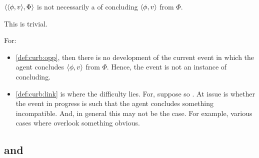 \begin{note}
  \begin{proposition}
    \(\langle \langle \phi, v \rangle, \Phi \rangle\) is not necessarily a  of concluding \(\langle \phi, v \rangle\) from \(\Phi\).
    \begin{argument}
      This is trivial.

      For:

      \begin{itemize}
      \item
        \ref{def:curb:opp}, then there is no development of the current event in which the agent concludes \(\langle \phi, v \rangle\) from \(\Phi\). Hence, the event is not an instance of concluding.
      \item
        \ref{def:curb:link} is where the difficulty lies.
        For, suppose so \pevent{}.
        At issue is whether the event in progress is such that the agent concludes something incompatible.
        And, in general this may not be the case.
        For example, various cases where overlook something obvious.
      \end{itemize}
    \end{argument}
  \end{proposition}
\end{note}




\subsection{ and }

